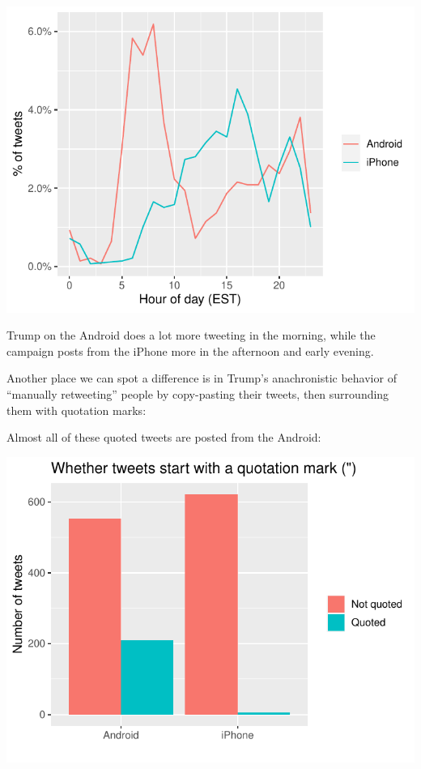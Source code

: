 \documentclass[
]{jss}
\begin{document}
\begin{CodeChunk}
\begin{center}\includegraphics{Live_Demo2_files/figure-latex/unnamed-chunk-2-1} \end{center}

\end{CodeChunk}

Trump on the Android does a lot more tweeting in the morning, while the
campaign posts from the iPhone more in the afternoon and early evening.

Another place we can spot a difference is in Trump's anachronistic
behavior of ``manually retweeting'' people by copy-pasting their tweets,
then surrounding them with quotation marks:

Almost all of these quoted tweets are posted from the Android:

\begin{CodeChunk}


\begin{center}\includegraphics{Live_Demo2_files/figure-latex/unnamed-chunk-3-1} \end{center}

\end{CodeChunk}
\end{document}
